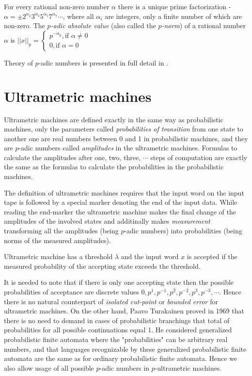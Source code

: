 \documentclass{llncs}
\begin{document}
\begin{definition}
For every rational non-zero number $\alpha$ there is a unique prime factorization - $\alpha = \pm 2^{\alpha_2}3^{\alpha_3}5^{\alpha_5}7^{\alpha_7} \cdots$, where all $\alpha_i$ are integers, only a finite number of which are non-zero. The \emph{$p$-adic absolute value} (also called the \emph{$p$-norm}) of a rational number $\alpha$ is 
$||x||_p = \begin{cases}
p^{-\alpha_p}, \text{if $\alpha \neq 0$} \\
0, \text{if $\alpha = 0$}
\end{cases} $
\end{definition}

Theory of $p$-adic numbers is presented in full detail in \cite{M00,G83,K84}.
 
\section{Ultrametric machines}

Ultrametric machines are defined exactly in the same way as probabilistic machines, only the parameters called {\em probabilities of transition}  from one state
to another one are real numbers between 0 and 1 in probabilistic machines, and they
are $p$-adic numbers called {\em amplitudes} in the ultrametric machines. Formulas to calculate the amplitudes after one, two, three, $\cdots $ steps of computation are exactly the same as the formulas to calculate the probabilities in the probabilistic machines. 


The definition of ultrametric machines requires that the input word on the input tape is followed by a special
marker denoting the end of the input data.  While reading the end-marker the ultrametric machine makes the final change of the amplitudes of the involved states and additinally makes {\em measurement} transforming all the amplitudes (being $p$-adic numbers) into probabilities (being norms of the measured amplitudes).

Ultrametric machine has a threshold $\lambda $ and the input word $x$ is accepted if the measured probability of the accepting state exceeds the threshold.

It is needed to note that if there is only one accepting state then the possible probabilities of acceptance are discrete values $0, p^1, p^{-1}, p^2, p^{-2}, p^3,
p^{-3}, \cdots $. Hence there is no natural counterpart of {\em isolated cut-point} or {\em bounded error} for ultrametric machines. On the other hand, Paavo Turakainen proved in 1969 that there is no need to demand in cases of probabilistic branchings that total of probabilities for all possible continuations equal 1. He considered generalized probabilistic finite automata where the "probabilities" can be arbitrary real numbers, and that languages recognizable by these generalized probabilistic finite automata are the same as for ordinary probabilistic finite automata. Hence we also allow usage of all possible $p$-adic numbers in $p$-ultrametric machines. 
\end{document}

